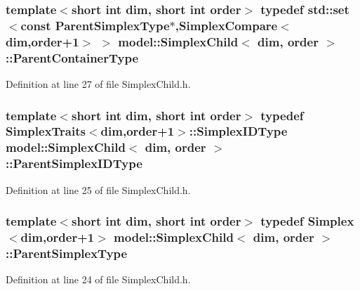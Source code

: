 \subsubsection[{Parent\+Container\+Type}]{\setlength{\rightskip}{0pt plus 5cm}template$<$short int dim, short int order$>$ typedef {\bf std\+::set}$<$const {\bf Parent\+Simplex\+Type}$\ast$,{\bf Simplex\+Compare}$<${\bf dim},order+1$>$ $>$ {\bf model\+::\+Simplex\+Child}$<$ {\bf dim}, order $>$\+::{\bf Parent\+Container\+Type}}\label{classmodel_1_1_simplex_child_aad7e4820d7c2450bbf9c328ba68d2bd7}


Definition at line 27 of file Simplex\+Child.\+h.

\hypertarget{classmodel_1_1_simplex_child_a7336897dae37e33597d636c48fef61d7}{}
\subsubsection[{Parent\+Simplex\+I\+D\+Type}]{\setlength{\rightskip}{0pt plus 5cm}template$<$short int dim, short int order$>$ typedef {\bf Simplex\+Traits}$<${\bf dim},order+1$>$\+::Simplex\+I\+D\+Type {\bf model\+::\+Simplex\+Child}$<$ {\bf dim}, order $>$\+::{\bf Parent\+Simplex\+I\+D\+Type}}\label{classmodel_1_1_simplex_child_a7336897dae37e33597d636c48fef61d7}


Definition at line 25 of file Simplex\+Child.\+h.

\hypertarget{classmodel_1_1_simplex_child_aa1c2795f491c9cd9dc6edd46acc9850c}{}
\subsubsection[{Parent\+Simplex\+Type}]{\setlength{\rightskip}{0pt plus 5cm}template$<$short int dim, short int order$>$ typedef {\bf Simplex}$<${\bf dim},order+1$>$ {\bf model\+::\+Simplex\+Child}$<$ {\bf dim}, order $>$\+::{\bf Parent\+Simplex\+Type}}\label{classmodel_1_1_simplex_child_aa1c2795f491c9cd9dc6edd46acc9850c}


Definition at line 24 of file Simplex\+Child.\+h.

\hypertarget{classmodel_1_1_simplex_child_abdb415921c164d40dc0f838a77ff39c4}{}
